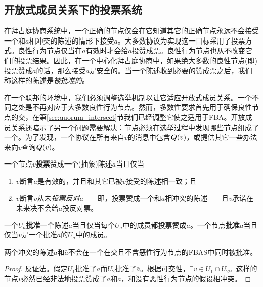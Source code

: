 \subsection{开放式成员关系下的投票系统}

在拜占庭协商系统中，一个正确的节点仅会在它知道其它的正确节点永远不会接受一个和$a$相冲突的陈述的情形下接受$a$。大多数协议为实现这一目标采用了投票方式。良性行为节点仅当在$a$有效时才会给$a$投赞成票。良性行为节点也从不改变它们的投票结果。因此，在一个中心化拜占庭协商中，如果绝大多数的良性节点(即{\quorum})投票赞成$a$的话，那么接受$a$是安全的。当一个陈述收到必要的赞成票之后，我们称这样的陈述是\textit{被批准的}。

在一个联邦的环境中，我们必须调整选举机制以让它适应开放式成员关系。一个不同之处是{\quorum}不再对应于大多数良性行为节点。然而，多数性要求首先用于确保良性节点的{\quorum}交，在第\ref{sec:quorum_intersect}节我们已经调整它使之适用于FBA。开放成员关系还暗示了另一个问题需要解决：节点必须在选举过程中发现哪些节点组成了一个{\quorum}。为了发现{\quorum}，一个协议在所有来自$v$的消息中包含${\bm Q}(v)$，或提供其它一些办法来向$v$查询${\bm Q}(v)$。

\begin{definition}[投票]
        一个节点$v$\textbf{投票}赞成一个(抽象)陈述$a$当且仅当
        \begin{enumerate}
                \item $v$断言$a$是有效的，并且和其它已被$v$接受的陈述相一致；且
                \item $v$断言$v$从未\textit{投票反对}$a$——即，投票赞成一个和$a$相冲突的陈述——且$v$承诺在未来决不会给$a$投反对票。
        \end{enumerate}
\end{definition}

\begin{definition}[批准]
        一个{\quorum}$U_a$\textbf{批准}一个陈述$a$当且仅当每个$U_a$中的成员都投票赞成$a$。一个节点\textbf{批准}$a$当且仅当$v$是一个批准$a$的{\quorum}$U_a$中的成员。
\end{definition}

\begin{theorem}\label{thm:cannot_ratify_contradictory}
        两个冲突的陈述$a$和$\bar a$不会在一个在{\quorum}交且不含恶性行为节点的FBAS中同时被批准。
\end{theorem}

\begin{proof}
        反证法。假定{\quorum}$U_1$批准了$a$而{\quorum}$U_2$批准了$\bar a$。根据{\quorum}可交性，$\exists v\in U_1\cap U_2$。这样的节点$v$必然已经非法地投票赞成了$a$和$\bar a$，和没有恶性行为节点的假设相冲突。
\end{proof}

